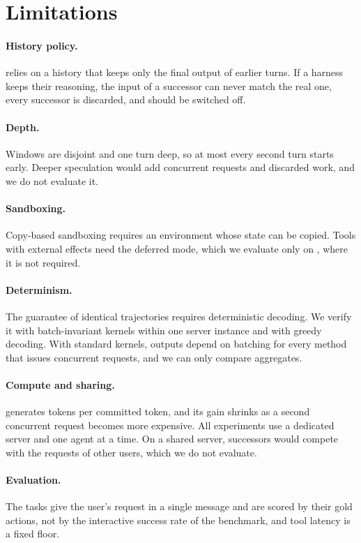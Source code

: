 \section*{Limitations}

\paragraph{History policy.}
\method relies on a history that keeps only the final output of earlier turns.
If a harness keeps their reasoning, the input of a successor can never match the real one, every successor is discarded, and \method should be switched off.

\paragraph{Depth.}
Windows are disjoint and one turn deep, so at most every second turn starts early.
Deeper speculation would add concurrent requests and discarded work, and we do not evaluate it.

\paragraph{Sandboxing.}
Copy-based sandboxing requires an environment whose state can be copied.
Tools with external effects need the deferred mode, which we evaluate only on \taubench, where it is not required.

\paragraph{Determinism.}
The guarantee of identical trajectories requires deterministic decoding.
We verify it with batch-invariant kernels within one server instance and with greedy decoding.
With standard kernels, outputs depend on batching for every method that issues concurrent requests, and we can only compare aggregates.

\paragraph{Compute and sharing.}
\method generates \OvhDetGenOurs{} tokens per committed token, and its gain shrinks as a second concurrent request becomes more expensive.
All experiments use a dedicated server and one agent at a time.
On a shared server, successors would compete with the requests of other users, which we do not evaluate.

\paragraph{Evaluation.}
The tasks give the user's request in a single message and are scored by their gold actions, not by the interactive success rate of the benchmark, and tool latency is a fixed floor.
